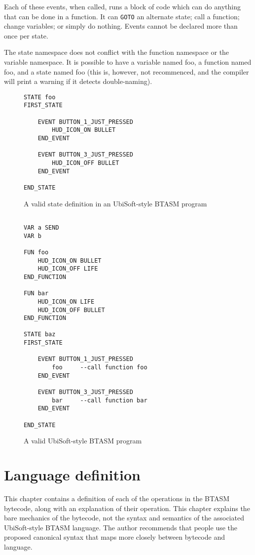 \documentclass[12pt]{scrbook}
\begin{document}
Each of these events, when called, runs a block of code which can do anything that can be done
in a function.  It can \texttt{GOTO} an alternate state; call a function; change variables; or
simply do nothing.  Events cannot be declared more than once per state.

The state namespace does not conflict with the function namespace or the variable namespace.  It is
possible to have a variable named foo, a function named foo, and a state named foo (this is, however,
not recommenced, and the compiler will print a warning if it detects double-naming).

\begin{figure}[h]
\begin{lstlisting}
STATE foo
FIRST_STATE

	EVENT BUTTON_1_JUST_PRESSED
		HUD_ICON_ON BULLET
	END_EVENT

	EVENT BUTTON_3_JUST_PRESSED
		HUD_ICON_OFF BULLET
	END_EVENT

END_STATE
\end{lstlisting}
\caption{A valid state definition in an UbiSoft-style BTASM program} 
\end{figure}

\begin{figure}[h]
\begin{lstlisting}

VAR a SEND
VAR b 

FUN foo
	HUD_ICON_ON BULLET
	HUD_ICON_OFF LIFE
END_FUNCTION

FUN bar
	HUD_ICON_ON LIFE
	HUD_ICON_OFF BULLET
END_FUNCTION
	
STATE baz
FIRST_STATE

	EVENT BUTTON_1_JUST_PRESSED
		foo		--call function foo
	END_EVENT

	EVENT BUTTON_3_JUST_PRESSED
		bar		--call function bar
	END_EVENT

END_STATE
\end{lstlisting}
\caption{A valid UbiSoft-style BTASM program} 
\end{figure}

\chapter{Language definition}
This chapter contains a definition of each of the operations in the BTASM bytecode, along with an
explanation of their operation.  This chapter explains the bare mechanics of the bytecode, not
the syntax and semantics of the associated UbiSoft-style BTASM language.  The author recommends
that people use the proposed canonical syntax that maps more closely between bytecode and language.
\end{document}
